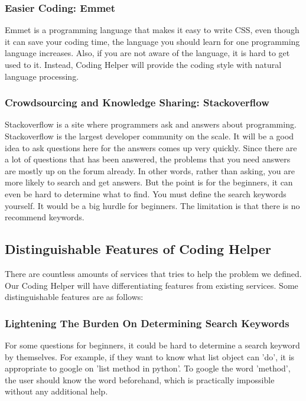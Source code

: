 \documentclass[conference]{IEEEtran}
\begin{document}
\subsubsection{Easier Coding: Emmet}
Emmet is a programming language that makes it easy to write CSS, even though it can save your coding time, the language you should learn for one programming language increases. Also, if you are not aware of the language, it is hard to get used to it. Instead, Coding Helper will provide the coding style with natural language processing.

\subsubsection{Crowdsourcing and Knowledge Sharing: Stackoverflow}
Stackoverflow is a site where programmers ask and answers about programming. Stackoverflow is the largest developer community on the scale. It will be a good idea to ask questions here for the answers comes up very quickly.
Since there are a lot of questions that has been answered, the problems that you need answers are mostly up on the forum already. In other words, rather than asking, you are more likely to search and get answers. But the point is for the beginners, it can even be hard to determine what to find. You must define the search keywords yourself. It would be a big hurdle for beginners. The limitation is that there is no recommend keywords.

\subsection{Distinguishable Features of Coding Helper} %
\label{sub:distinguishable_features_of_assignment_helper}
There are countless amounts of services that tries to help the problem we defined. Our Coding Helper will have differentiating features from existing services. Some distinguishable features are as follows:

\subsubsection{Lightening The Burden On Determining Search Keywords}
For some questions for beginners, it could be hard to determine a search keyword by themselves. For example, if they want to know what list object can 'do', it is appropriate to google on 'list method in python'. To google the word 'method', the user should know the word beforehand, which is practically impossible without any additional help.
\end{document}
